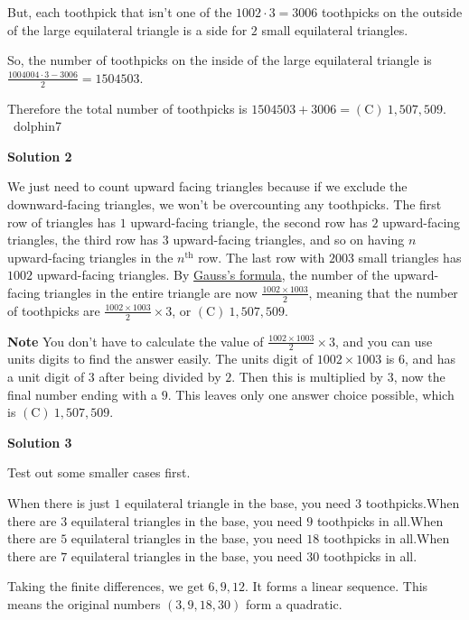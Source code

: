 \begin{enumerate}
 But, each toothpick that isn't one of the $1002\cdot3=3006$ toothpicks on the outside of the large equilateral triangle is a side for $2$ small equilateral triangles. 

 So, the number of toothpicks on the inside of the large equilateral triangle is $\frac{1004004\cdot3-3006}{2}=1504503$.

 Therefore the total number of toothpicks is $1504503+3006=\boxed{\mathrm{(C)}\ 1,507,509}$. ~dolphin7

 



\textbf{Solution 2}

We just need to count upward facing triangles because if we exclude the downward-facing triangles, we won't be overcounting any toothpicks. The first row of triangles has $1$ upward-facing triangle, the second row has $2$ upward-facing triangles, the third row has $3$ upward-facing triangles, and so on having $n$ upward-facing triangles in the $n^\text{th}$ row. The last row with $2003$ small triangles has $1002$ upward-facing triangles. By \href{https://artofproblemsolving.com/wiki/index.php?title=Triangular\_number}{Gauss's formula}, the number of the upward-facing triangles in the entire triangle are now $\frac{1002\times1003}{2}$, meaning that the number of toothpicks are $\frac{1002\times1003}{2}\times3$, or $\boxed{\mathrm{(C)}\ 1,507,509}$.

 \textbf{Note} You don't have to calculate the value of $\frac{1002\times1003}{2}\times3$, and you can use units digits to find the answer easily. The units digit of $1002\times1003$ is $6$, and has a unit digit of $3$ after being divided by $2$. Then this is multiplied by $3$, now the final number ending with a $9$. This leaves only one answer choice possible, which is $\boxed{\mathrm{(C)}\ 1,507,509}$.

 



\textbf{Solution 3}

Test out some smaller cases first.

 When there is just $1$ equilateral triangle in the base, you need $3$ toothpicks.When there are $3$ equilateral triangles in the base, you need $9$ toothpicks in all.When there are $5$ equilateral triangles in the base, you need $18$ toothpicks in all.When there are $7$ equilateral triangles in the base, you need $30$ toothpicks in all.

 Taking the finite differences, we get $6, 9, 12.$ It forms a linear sequence. This means the original numbers $(3, 9, 18, 30)$ form a quadratic.


\end{enumerate}
